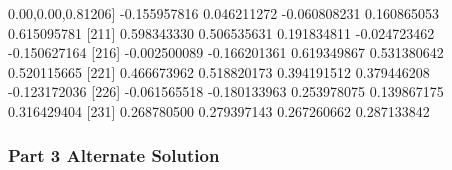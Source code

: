 \documentclass[
]{article}
\newenvironment{Shaded}{\begin{snugshade}}{\end{snugshade}}
\newcommand{\DecValTok}[1]{\textcolor[rgb]{0.00,0.00,0.81}{#1}}
\newcommand{\FloatTok}[1]{\textcolor[rgb]{0.00,0.00,0.81}{#1}}
\newcommand{\NormalTok}[1]{#1}
\newcommand{\SpecialCharTok}[1]{\textcolor[rgb]{0.00,0.00,0.00}{#1}}
\begin{document}
\begin{Shaded}
\begin{Highlighting}[]
\NormalTok{[}\DecValTok{206}\NormalTok{] }\SpecialCharTok{{-}}\FloatTok{0.155957816}  \FloatTok{0.046211272} \SpecialCharTok{{-}}\FloatTok{0.060808231}  \FloatTok{0.160865053}  \FloatTok{0.615095781}
\NormalTok{[}\DecValTok{211}\NormalTok{]  }\FloatTok{0.598343330}  \FloatTok{0.506535631}  \FloatTok{0.191834811} \SpecialCharTok{{-}}\FloatTok{0.024723462} \SpecialCharTok{{-}}\FloatTok{0.150627164}
\NormalTok{[}\DecValTok{216}\NormalTok{] }\SpecialCharTok{{-}}\FloatTok{0.002500089} \SpecialCharTok{{-}}\FloatTok{0.166201361}  \FloatTok{0.619349867}  \FloatTok{0.531380642}  \FloatTok{0.520115665}
\NormalTok{[}\DecValTok{221}\NormalTok{]  }\FloatTok{0.466673962}  \FloatTok{0.518820173}  \FloatTok{0.394191512}  \FloatTok{0.379446208} \SpecialCharTok{{-}}\FloatTok{0.123172036}
\NormalTok{[}\DecValTok{226}\NormalTok{] }\SpecialCharTok{{-}}\FloatTok{0.061565518} \SpecialCharTok{{-}}\FloatTok{0.180133963}  \FloatTok{0.253978075}  \FloatTok{0.139867175}  \FloatTok{0.316429404}
\NormalTok{[}\DecValTok{231}\NormalTok{]  }\FloatTok{0.268780500}  \FloatTok{0.279397143}  \FloatTok{0.267260662}  \FloatTok{0.287133842}
\end{Highlighting}
\end{Shaded}

\hypertarget{part-3-alternate-solution}{%
\subsubsection{Part 3 Alternate
Solution}\label{part-3-alternate-solution}}
\end{document}
